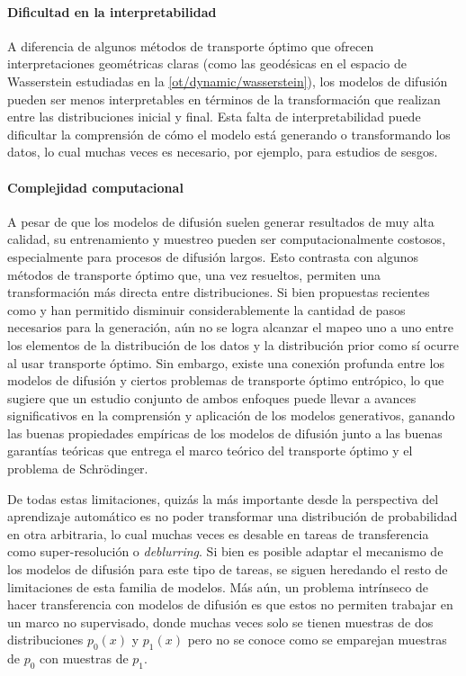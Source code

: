 \paragraph{Dificultad en la interpretabilidad}

A diferencia de algunos métodos de transporte óptimo que ofrecen interpretaciones geométricas claras (como las geodésicas en el espacio de Wasserstein estudiadas en la \autoref{ot/dynamic/wasserstein}), los modelos de difusión pueden ser menos interpretables en términos de la transformación que realizan entre las distribuciones inicial y final. Esta falta de interpretabilidad puede dificultar la comprensión de cómo el modelo está generando o transformando los datos, lo cual muchas veces es necesario, por ejemplo, para estudios de sesgos.

\paragraph{Complejidad computacional}

A pesar de que los modelos de difusión suelen generar resultados de muy alta calidad, su entrenamiento y muestreo pueden ser computacionalmente costosos, especialmente para procesos de difusión largos. Esto contrasta con algunos métodos de transporte óptimo que, una vez resueltos, permiten una transformación más directa entre distribuciones. Si bien propuestas recientes como \cite{song2023consistencymodels} y \cite{salimans2022progressivedistillationfastsampling} han permitido disminuir considerablemente la cantidad de pasos necesarios para la generación, aún no se logra alcanzar el mapeo uno a uno entre los elementos de la distribución de los datos y la distribución prior como sí ocurre al usar transporte óptimo. Sin embargo, existe una conexión profunda entre los modelos de difusión y ciertos problemas de transporte óptimo entrópico, lo que sugiere que un estudio conjunto de ambos enfoques puede llevar a avances significativos en la comprensión y aplicación de los modelos generativos, ganando las buenas propiedades empíricas de los modelos de difusión junto a las buenas garantías teóricas que entrega el marco teórico del transporte óptimo y el problema de Schrödinger.

De todas estas limitaciones, quizás la más importante desde la perspectiva del aprendizaje automático es no poder transformar una distribución de probabilidad en otra arbitraria, lo cual muchas veces es desable en tareas de transferencia como super-resolución o \textit{deblurring}. Si bien es posible adaptar el mecanismo de los modelos de difusión para este tipo de tareas, se siguen heredando el resto de limitaciones de esta familia de modelos. Más aún, un problema intrínseco de hacer transferencia con modelos de difusión es que estos no permiten trabajar en un marco no supervisado, donde muchas veces solo se tienen muestras de dos distribuciones $p_0(x)$ y $p_1(x)$ pero no se conoce como se emparejan muestras de $p_0$ con muestras de $p_1$.

